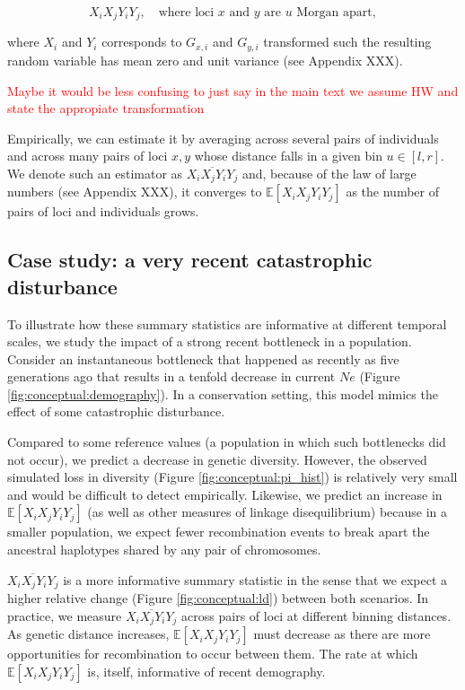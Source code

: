 \documentclass[12pt]{article}
\begin{document}
\begin{equation}
	X_i X_j Y_i Y_j,
	\quad \text{where loci } x \text{ and } y \text{ are } u \text{ Morgan apart},
\end{equation}

where $X_i$ and $Y_i$ corresponds to $G_{x,i}$ and $G_{y,i}$ transformed such the resulting random variable has mean zero and unit variance (see Appendix XXX).

\textcolor{red}{Maybe it would be less confusing to just say in the main text we assume HW and state the appropiate transformation }

Empirically, we can estimate it by averaging across several pairs of individuals and across many pairs of loci $x, y$ whose distance falls in a given bin $u\in[l, r]$. We denote such an estimator as $\overline{X_i X_j Y_i Y_j}$ and, because of the law of large numbers (see Appendix XXX), it converges to $\mathbb E [	X_i X_j Y_i Y_j]$ as the number of pairs of loci and individuals grows.

\subsection{Case study: a very recent catastrophic disturbance}

To illustrate how these summary statistics are informative at different temporal scales, we study the impact of a strong recent bottleneck in a population. Consider an instantaneous bottleneck that happened as recently as five generations ago that results in a tenfold decrease in current $Ne$ (Figure \ref{fig:conceptual:demography}). In a conservation setting, this model mimics the effect of some catastrophic disturbance.


Compared to some reference values (a population in which such bottlenecks did not occur), we predict a decrease in genetic diversity. However, the observed simulated loss in diversity (Figure \ref{fig:conceptual:pi_hist}) is relatively very small and would be difficult to detect empirically. Likewise, we predict an increase in $\mathbb E[X_iX_jY_iY_j]$ (as well as other measures of linkage disequilibrium) because in a smaller population, we expect fewer recombination events to break apart the ancestral haplotypes shared by any pair of chromosomes.

$\overline{X_iX_jY_iY_j}$ is a more informative summary statistic in the sense that we expect a higher relative change (Figure \ref{fig:conceptual:ld}) between both scenarios. In practice, we measure $\overline{X_iX_jY_iY_j}$ across pairs of loci at different binning distances. As genetic distance increases, $\mathbb{E}[X_iX_jY_iY_j]$ must decrease as there are more opportunities for recombination to occur between them. The rate at which $\mathbb{E}[X_iX_jY_iY_j]$ is, itself, informative of recent demography.
\end{document}
